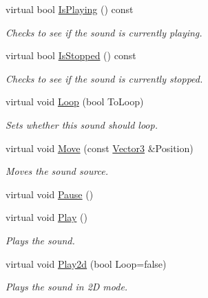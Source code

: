 \begin{DoxyCompactItemize}
virtual bool \hyperlink{classMezzanine_1_1Audio_1_1Sound_a625331bf3d995a129529a780a97f086b}{IsPlaying} () const 
\begin{DoxyCompactList}\small\item\em Checks to see if the sound is currently playing. \item\end{DoxyCompactList}\item 
virtual bool \hyperlink{classMezzanine_1_1Audio_1_1Sound_a9174378c97699bb32812984cd74b51ee}{IsStopped} () const 
\begin{DoxyCompactList}\small\item\em Checks to see if the sound is currently stopped. \item\end{DoxyCompactList}\item 
virtual void \hyperlink{classMezzanine_1_1Audio_1_1Sound_ae8747ddd906e7e0f65ba4ac1aa748525}{Loop} (bool ToLoop)
\begin{DoxyCompactList}\small\item\em Sets whether this sound should loop. \item\end{DoxyCompactList}\item 
virtual void \hyperlink{classMezzanine_1_1Audio_1_1Sound_a593eae500e9a29c622c8e94df2e86baa}{Move} (const \hyperlink{classMezzanine_1_1Vector3}{Vector3} \&Position)
\begin{DoxyCompactList}\small\item\em Moves the sound source. \item\end{DoxyCompactList}\item 
virtual void \hyperlink{classMezzanine_1_1Audio_1_1Sound_a2dd1ce1638240021be219774236bd837}{Pause} ()
\item 
virtual void \hyperlink{classMezzanine_1_1Audio_1_1Sound_a3cdf4ec1159b6c26a1abebcdd8255e80}{Play} ()
\begin{DoxyCompactList}\small\item\em Plays the sound. \item\end{DoxyCompactList}\item 
virtual void \hyperlink{classMezzanine_1_1Audio_1_1Sound_a5f549b02f28454d79d5f8bb35bebf679}{Play2d} (bool Loop=false)
\begin{DoxyCompactList}\small\item\em Plays the sound in 2D mode. \item\end{DoxyCompactList}\item 

\end{DoxyCompactItemize}
